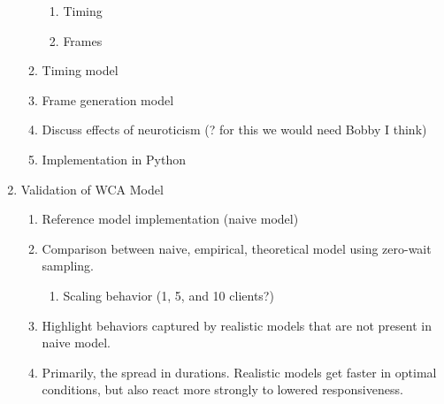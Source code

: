 \begin{enumerate}
\begin{enumerate}
                \begin{enumerate}
                    \item Timing
                    \item Frames
                \end{enumerate}
            \item Timing model
            \item Frame generation model
            \item Discuss effects of neuroticism (? for this we would need Bobby I think)
            \item Implementation in Python
        \end{enumerate}
    \item Validation of WCA Model
    \begin{enumerate}
        \item Reference model implementation (naive model)
        \item Comparison between naive, empirical, theoretical model using zero-wait sampling.
        \begin{enumerate}
            \item Scaling behavior (1, 5, and 10 clients?)
        \end{enumerate}
        \item Highlight behaviors captured by realistic models that are not present in naive model.
        \item Primarily, the spread in durations. Realistic models get faster in optimal conditions, but also react more strongly to lowered responsiveness.
    \end{enumerate}


\end{enumerate}
